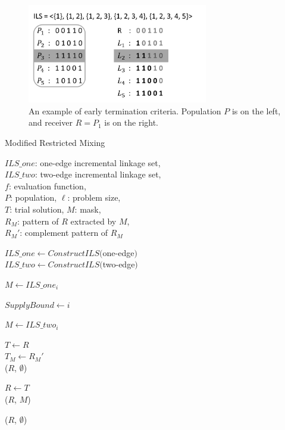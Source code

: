 \documentclass{sig-alternate-05-2015}
\begin{document}
\begin{figure}
\centering
\includegraphics[width=3.1in]{IsinP}
\caption{An example of early termination criteria. Population $ P $ is on the left, and receiver $ R  = P_{1} $ is on the right.}
\end{figure}


\begin{algorithm}
\caption{Modified Restricted Mixing}\label{algo_disjdecomp}

$ILS\_one$: one-edge incremental linkage set,\\
$ILS\_two$: two-edge incremental linkage set,\\
$f$: evaluation function, \\
$P$: population, $\ell$: problem size, \\
$T$: trial solution, $M$: mask, \\
${R_M}$: pattern of $R$ extracted by $M$, \\
${R_M}'$: complement pattern of ${R_M}$



\BlankLine
$ILS\_one  \leftarrow ConstructILS($one-edge$)$\\
$ILS\_two  \leftarrow ConstructILS($two-edge$)$
\BlankLine
{} {
    $M \leftarrow ILS\_one_i$ \\
     {
        $ SupplyBound \leftarrow i$
       
    }
}

\BlankLine
{} {

    $M \leftarrow ILS\_two_i$ \\

     {

        $T \leftarrow R$ \\
        $T_M \leftarrow {R_M}'$ \\

         {
            \Return ($R$, $\emptyset$) 
        }

         {
            $R \leftarrow T$ \\
            \Return ($R$, $M$)
        }
    }
}
\Return ($R$, $\emptyset$) 
\end{algorithm}
\end{document}
